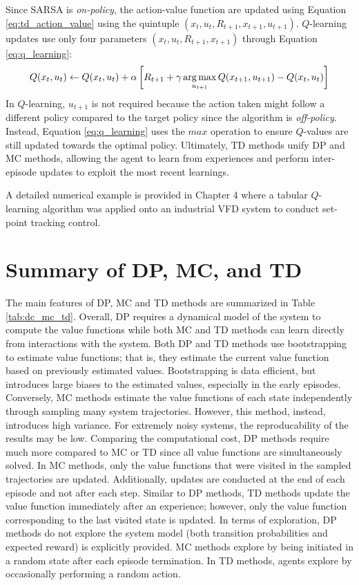 Since SARSA is \textit{on-policy}, the action-value function are updated using Equation \ref{eq:td_action_value} using the quintuple $(x_t, u_t, R_{t+1}, x_{t+1}, u_{t+1})$. $Q$-learning updates use only four parameters $(x_t, u_t, R_{t+1}, x_{t+1})$ through Equation \ref{eq:q_learning}:
\begin{equation}
    Q(x_t, u_t) \leftarrow Q(x_t, u_t) + \alpha \left[R_{t+1} + \gamma \operatorname*{arg\,max}_{u_{t+1}} Q(x_{t+1}, u_{t+1}) - Q(x_t, u_t) \right]
    \label{eq:q_learning}
\end{equation}
In $Q$-learning, $u_{t+1}$ is not required because the action taken might follow a different policy compared to the target policy since the algorithm is \textit{off-policy}. Instead, Equation \ref{eq:q_learning} uses the $max$ operation to ensure $Q$-values are still updated towards the optimal policy. Ultimately, TD methods unify DP and MC methods, allowing the agent to learn from experiences and perform inter-episode updates to exploit the most recent learnings.

A detailed numerical example is provided in Chapter 4 where a tabular $Q$-learning algorithm was applied onto an industrial VFD system to conduct set-point tracking control.



\section{Summary of DP, MC, and TD}
The main features of DP, MC and TD methods are summarized in Table \ref{tab:dc_mc_td}. Overall, DP requires a dynamical model of the system to compute the value functions while both MC and TD methods can learn directly from interactions with the system. Both DP and TD methods use bootstrapping to estimate value functions; that is, they estimate the current value function based on previously estimated values. Bootstrapping is data efficient, but introduces large biases to the estimated values, especially in the early episodes.  Conversely, MC methods estimate the value functions of each state independently through sampling many system trajectories.  However, this method, instead, introduces high variance. For extremely noisy systems, the reproducability of the results may be low. Comparing the computational cost, DP methods require much more compared to MC or TD since all value functions are simultaneously solved. In MC methods, only the value functions that were visited in the sampled trajectories are updated.  Additionally, updates are conducted at the end of each episode and not after each step. Similar to DP methods, TD methods update the value function immediately after an experience; however, only the value function corresponding to the last visited state is updated. In terms of exploration, DP methods do not explore the system model (both transition probabilities and expected reward) is explicitly provided. MC methods explore by being initiated in a random state after each episode termination. In TD methods, agents explore by occasionally performing a random action.

